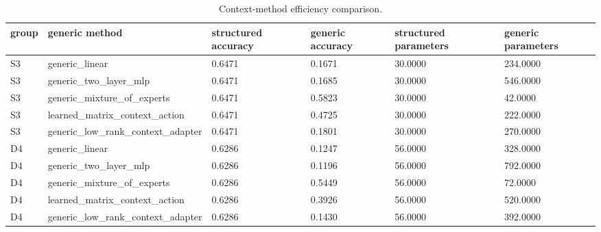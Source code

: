 \begin{table}[t]
\centering
\caption{Context-method efficiency comparison.}
\begin{tabular}{llllll}
\toprule
group & generic method & structured accuracy & generic accuracy & structured parameters & generic parameters \\
\midrule
S3 & generic\_linear & 0.6471 & 0.1671 & 30.0000 & 234.0000 \\
S3 & generic\_two\_layer\_mlp & 0.6471 & 0.1685 & 30.0000 & 546.0000 \\
S3 & generic\_mixture\_of\_experts & 0.6471 & 0.5823 & 30.0000 & 42.0000 \\
S3 & learned\_matrix\_context\_action & 0.6471 & 0.4725 & 30.0000 & 222.0000 \\
S3 & generic\_low\_rank\_context\_adapter & 0.6471 & 0.1801 & 30.0000 & 270.0000 \\
D4 & generic\_linear & 0.6286 & 0.1247 & 56.0000 & 328.0000 \\
D4 & generic\_two\_layer\_mlp & 0.6286 & 0.1196 & 56.0000 & 792.0000 \\
D4 & generic\_mixture\_of\_experts & 0.6286 & 0.5449 & 56.0000 & 72.0000 \\
D4 & learned\_matrix\_context\_action & 0.6286 & 0.3926 & 56.0000 & 520.0000 \\
D4 & generic\_low\_rank\_context\_adapter & 0.6286 & 0.1430 & 56.0000 & 392.0000 \\
\bottomrule
\end{tabular}
\end{table}
